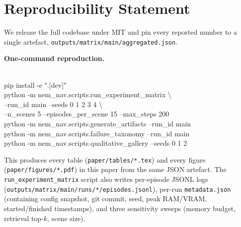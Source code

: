 \documentclass[conference,a4paper,10pt]{IEEEtran}
\begin{document}
\section*{Reproducibility Statement}

We release the full codebase under MIT and pin every reported number to
a single artefact, \texttt{outputs/matrix/main/aggregated.json}.

\textbf{One-command reproduction.
}
{\footnotesize\ttfamily
\noindent \\pip install -e ".[dev]"\\
python -m nem\_nav.scripts.run\_experiment\_matrix \textbackslash{}\\
\hspace*{1.5em}--run\_id main --seeds 0 1 2 3 4 \textbackslash{}\\
\hspace*{1.5em}--n\_scenes 5 --episodes\_per\_scene 15 --max\_steps 200\\
python -m nem\_nav.scripts.generate\_artifacts --run\_id main\\
python -m nem\_nav.scripts.failure\_taxonomy --run\_id main\\
python -m nem\_nav.scripts.qualitative\_gallery --seeds 0 1 2\par
}

This produces every table (\texttt{paper/tables/*.tex}) and every figure
(\texttt{paper/figures/*.pdf}) in this paper from the same JSON
artefact. The \texttt{run\_experiment\_matrix} script also writes
per-episode JSONL logs (\texttt{outputs/matrix/main/runs/*/episodes.jsonl}),
per-run \texttt{metadata.json} (containing config snapshot, git commit,
seed, peak RAM/VRAM, started/finished timestamps), and three sensitivity
sweeps (memory budget, retrieval top-$k$, scene size).
\end{document}
